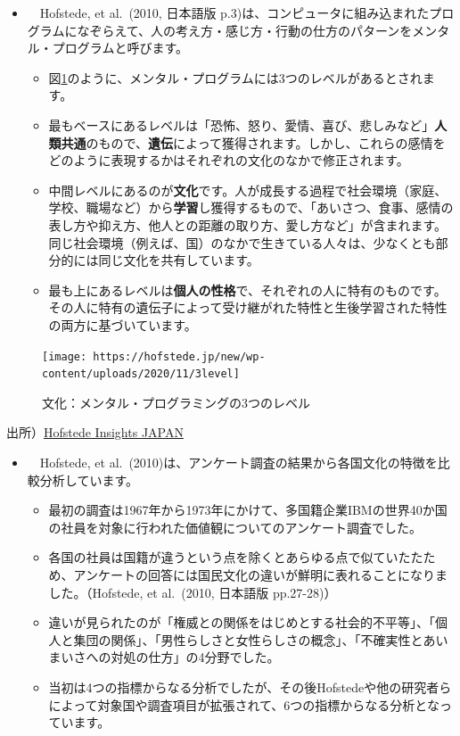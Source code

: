 \documentclass[
]{book}
\begin{document}
\begin{itemize}
\item
  　Hofstede, et al.~(2010, 日本語版 p.3)は、コンピュータに組み込まれたプログラムになぞらえて、人の考え方・感じ方・行動の仕方のパターンをメンタル・プログラムと呼びます。

  \begin{itemize}
  \item
    図\ref{fig:culture}のように、メンタル・プログラムには3つのレベルがあるとされます。
  \item
    最もベースにあるレベルは「恐怖、怒り、愛情、喜び、悲しみなど」\textbf{人類共通}のもので、\textbf{遺伝}によって獲得されます。しかし、これらの感情をどのように表現するかはそれぞれの文化のなかで修正されます。
  \item
    中間レベルにあるのが\textbf{文化}です。人が成長する過程で社会環境（家庭、学校、職場など）から\textbf{学習}し獲得するもので、「あいさつ、食事、感情の表し方や抑え方、他人との距離の取り方、愛し方など」が含まれます。同じ社会環境（例えば、国）のなかで生きている人々は、少なくとも部分的には同じ文化を共有しています。
  \item
    最も上にあるレベルは\textbf{個人の性格}で、それぞれの人に特有のものです。その人に特有の遺伝子によって受け継がれた特性と生後学習された特性の両方に基づいています。
  \end{itemize}
\end{itemize}

\begin{figure}
\texttt{[image: https://hofstede.jp/new/wp-content/uploads/2020/11/3level]} \caption{文化：メンタル・プログラミングの3つのレベル}\label{fig:culture}
\end{figure}

出所）\href{https://hofstede.jp/mbti-hofstede/}{Hofstede Insights JAPAN}

\begin{itemize}
\item
  　Hofstede, et al.~(2010)は、アンケート調査の結果から各国文化の特徴を比較分析しています。

  \begin{itemize}
  \item
    最初の調査は1967年から1973年にかけて、多国籍企業IBMの世界40か国の社員を対象に行われた価値観についてのアンケート調査でした。
  \item
    各国の社員は国籍が違うという点を除くとあらゆる点で似ていたたため、アンケートの回答には国民文化の違いが鮮明に表れることになりました。（Hofstede, et al.~(2010, 日本語版 pp.27-28)）
  \item
    違いが見られたのが「権威との関係をはじめとする社会的不平等」、「個人と集団の関係」、「男性らしさと女性らしさの概念」、「不確実性とあいまいさへの対処の仕方」の4分野でした。
  \item
    当初は4つの指標からなる分析でしたが、その後Hofstedeや他の研究者らによって対象国や調査項目が拡張されて、6つの指標からなる分析となっています。
  \end{itemize}
\end{itemize}
\end{document}

